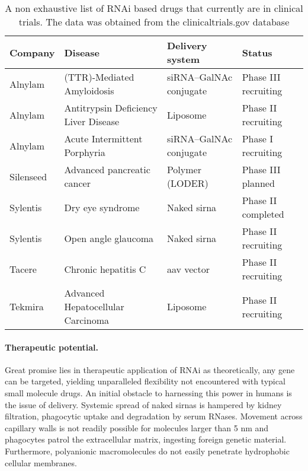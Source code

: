 \begin{table}
  \centering
  \caption[A selection of RNAi based drugs in clinical trials.]{A non exhaustive list of RNAi based drugs that currently are in clinical trials. The data was obtained from the clinicaltrials.gov database \cite{McCray2000}}
  \label{tab:rnai-clinical}
  \footnotesize
  \begin{tabular}{L{1.5cm}L{3cm}L{2.5cm}L{2cm}}
    Company &
      Disease &
      Delivery system &
      Status \\
    \hline 
    Alnylam &
      (TTR)-Mediated Amyloidosis &
      siRNA–GalNAc conjugate &
      Phase III recruiting \\
    Alnylam &
      Antitrypsin Deficiency Liver Disease &
      Liposome &
      Phase II recruiting \\
    Alnylam &
      Acute Intermittent Porphyria &
      siRNA–GalNAc conjugate &
      Phase I recruiting \\
    Silenseed &
      Advanced pancreatic cancer &
      Polymer (LODER) &
      Phase III planned \\
    Sylentis &
      Dry eye syndrome &
      Naked \gls{sirna} &
      Phase II completed \\
    Sylentis &
      Open angle glaucoma &
      Naked \gls{sirna} &
      Phase II recruiting \\
    Tacere &
      Chronic hepatitis C &
      \gls{aav} vector &
      Phase II recruiting \\
    Tekmira  &
      Advanced Hepatocellular Carcinoma &
      Liposome &
      Phase II recruiting \\
      \hline
  \end{tabular}
\end{table}

\paragraph{Therapeutic potential.}
Great promise lies in therapeutic application of RNAi as theoretically, any gene can be targeted, yielding unparalleled flexibility not encountered with typical small molecule drugs. An initial obstacle to harnessing this power in humans is the issue of delivery. Systemic spread of naked \glspl{sirna} is hampered by kidney filtration, phagocytic uptake and degradation by serum RNases. Movement across capillary walls is not readily possible for molecules larger than 5 nm and phagocytes patrol the extracellular matrix, ingesting foreign genetic material. Furthermore, polyanionic macromolecules do not easily penetrate hydrophobic cellular membranes.

